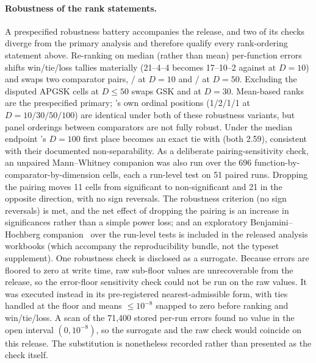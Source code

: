 \paragraph{Robustness of the rank statements.}
A prespecified robustness battery accompanies the release, and two
of its checks diverge from the primary analysis and therefore qualify
every rank-ordering statement above. Re-ranking on median (rather
than mean) per-function errors shifts win/tie/loss tallies materially
(21--4--4 becomes 17--10--2 against \egsk{} at $D = 10$) and
swaps two comparator pairs, \apgsk{}/\egsk{} at $D = 10$ and
\fdbagsk{}/\atmals{} at $D = 50$. Excluding the disputed APGSK cells
at $D \leq 50$ swaps GSK and \fdbagsk{} at $D = 30$.
Mean-based ranks are the prespecified primary; \dtgsk{}'s own
ordinal positions (1/2/1/1 at $D = 10/30/50/100$) are identical under
both of these robustness variants, but panel orderings between comparators are not fully
robust. Under the median endpoint \dtgsk{}'s $D = 100$ first place becomes
an exact tie with \egsk{} (both 2.59), consistent with their documented
non-separability. As a deliberate pairing-sensitivity check, an unpaired Mann--Whitney companion was also run over the
696 function-by-comparator-by-dimension cells, each a run-level test on 51
paired runs. Dropping the pairing moves 11 cells from significant to
non-significant and 21 in the opposite direction, with no sign reversals. The
robustness criterion (no sign reversals) is met, and the net effect of
dropping the pairing is an increase in significances rather than a
simple power loss; and an
exploratory Benjamini--Hochberg
companion~\cite{benjamini1995controlling} over the run-level tests is
included in the released analysis workbooks (which accompany the
reproducibility bundle, not the typeset supplement).
One robustness check is disclosed as a surrogate. Because errors are floored
to zero at write time, raw sub-floor values are unrecoverable from the
release, so the error-floor sensitivity check could not be run on the raw
values. It was executed instead in its pre-registered nearest-admissible form,
with ties handled at the floor and means $\le 10^{-8}$ snapped to zero before
ranking and win/tie/loss. A scan of the 71,400 stored per-run errors found no
value in the open interval $(0, 10^{-8})$, so the surrogate and the raw check
would coincide on this release. The substitution is nonetheless recorded rather
than presented as the check itself.

